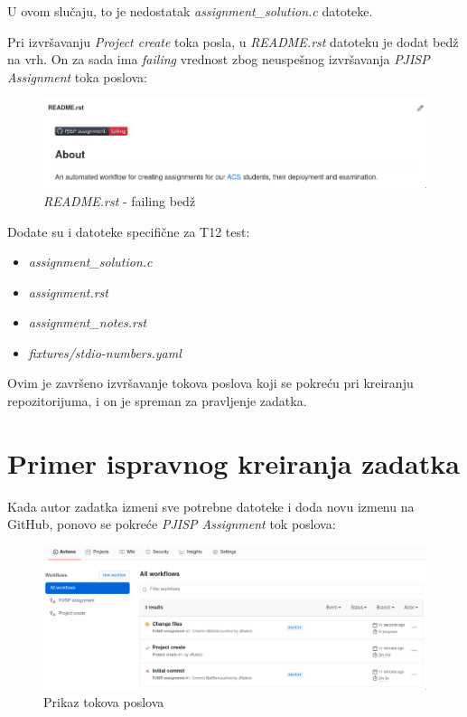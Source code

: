 \documentclass[12pt]{report}
\begin{document}
U ovom slučaju, to je nedostatak \textit{assignment\_solution.c} datoteke.

Pri izvršavanju \textit{Project create} toka posla, u \textit{README.rst} datoteku je dodat bedž na vrh. On za sada ima \textit{failing} vrednost zbog neuspešnog izvršavanja \textit{PJISP Assignment} toka poslova:

\begin{figure}[H]
    \centering
    \includegraphics[width=\linewidth]{images/12.png}
    \caption{\textit{README.rst} - failing bedž}
\end{figure}

Dodate su i datoteke specifične za T12 test:

\begin{itemize}
    \item \textit{assignment\_solution.c}
    \item \textit{assignment.rst}
    \item \textit{assignment\_notes.rst}
    \item \textit{fixtures/stdio-numbers.yaml}
\end{itemize}

Ovim je završeno izvršavanje tokova poslova koji se pokreću pri kreiranju repozitorijuma, i on je spreman za pravljenje zadatka.

\section{Primer ispravnog kreiranja zadatka}

Kada autor zadatka izmeni sve potrebne datoteke i doda novu izmenu na GitHub, ponovo se pokreće \textit{PJISP Assignment} tok poslova:

\begin{figure}[H]
    \centering
    \includegraphics[width=\linewidth]{images/13.png}
    \caption{Prikaz tokova poslova}
\end{figure}
\end{document}
